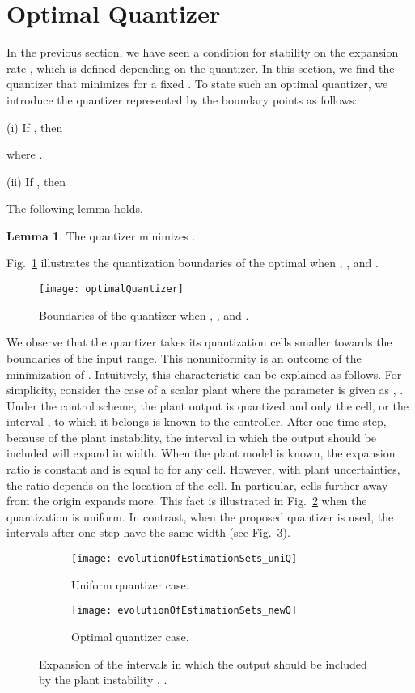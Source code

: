 \documentclass[a4paper, 11pt]{article}
\theoremstyle{definition}
\newtheorem{lem}{Lemma}
\newcommand{\fref}[1]{Fig.~\ref{#1}}
\begin{document}
\section{Optimal Quantizer}\label{sec,opt_q}
In the previous section, we have seen a condition for stability on the
expansion rate , which is defined depending on the quantizer.
In this section, we find the quantizer that minimizes  for a fixed .
To state such an optimal quantizer, we introduce the quantizer 
represented by the boundary points  as follows:

(i) If , then

where .

(ii) If , then


The following lemma holds.
\begin{lem}\label{lem,opt_q}
 The quantizer  minimizes .
\end{lem}

\fref{fig,q^*} illustrates the quantization boundaries  of
the optimal  when , , and .
\begin{figure}[tbp]
 \centering
 \texttt{[image: optimalQuantizer]}
 \caption{Boundaries of the quantizer  when ,
 , and .}
\label{fig,q^*}
\end{figure}
We observe that the quantizer takes its quantization cells smaller towards
the boundaries  of the input range.
This nonuniformity is an outcome of the minimization of .
Intuitively, this characteristic can be explained as follows.
For simplicity, consider the case of a scalar plant where the parameter
is given as , .
Under the control scheme, the plant output  is quantized and only the cell,
or the interval , to which it belongs is known to the controller.
After one time step, because of the plant instability, the interval in which
the output should be included will expand in width.
When the plant model is known, the expansion ratio is constant and is equal
to  for any cell.
However, with plant uncertainties, the ratio depends on the location
of the cell.
In particular, cells further away from the origin expands more.
This fact is illustrated in \fref{fig,AYuni} when the quantization is uniform.
In contrast, when the proposed quantizer  is used, the intervals
after one step have the same width (see \fref{fig,AYopt}).
\begin{figure}[t]
 \begin{subfigure}{\linewidth}
  \centering
  \texttt{[image: evolutionOfEstimationSets\_uniQ]}
  \caption{Uniform quantizer case.} \label{fig,AYuni}
 \end{subfigure}
 \begin{subfigure}{\linewidth}
  \centering
  \texttt{[image: evolutionOfEstimationSets\_newQ]}
  \caption{Optimal quantizer case.} \label{fig,AYopt}
 \end{subfigure}
 \caption{Expansion of the intervals in which the output should be included 
 by the plant instability , .}
 \label{fig,AY}
\end{figure}
 
\end{document}
